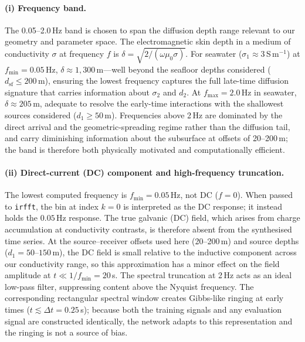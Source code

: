 \documentclass[journal]{IEEEtran}
\begin{document}
\paragraph{(i) Frequency band.}
The 0.05--2.0\,Hz band is chosen to span the diffusion depth range
relevant to our geometry and parameter space.  The electromagnetic
skin depth in a medium of conductivity $\sigma$ at frequency $f$ is
$\delta = \sqrt{2/(\omega\mu_0\sigma)}$.  For seawater
($\sigma_1 \approx 3$\,S\,m$^{-1}$) at $f_\mathrm{min} = 0.05$\,Hz,
$\delta \approx 1{,}300$\,m---well beyond the seafloor depths
considered ($d_\mathrm{sf} \leq 200$\,m), ensuring the lowest
frequency captures the full late-time diffusion signature
that carries information about $\sigma_2$ and $d_2$.  At
$f_\mathrm{max} = 2.0$\,Hz in seawater, $\delta \approx 205$\,m,
adequate to resolve the early-time interactions with the shallowest
sources considered ($d_1 \geq 50$\,m).  Frequencies above 2\,Hz
are dominated by the direct arrival and the geometric-spreading
regime rather than the diffusion tail, and carry diminishing
information about the subsurface at offsets of 20--200\,m; the
band is therefore both physically motivated and computationally
efficient.

\paragraph{(ii) Direct-current (DC) component and high-frequency truncation.}
The lowest computed frequency is $f_\mathrm{min} = 0.05$\,Hz,
not DC ($f = 0$).  When passed to \texttt{irfft}, the bin at index
$k = 0$ is interpreted as the DC response; it instead holds the
$0.05$\,Hz response.  The true galvanic (DC) field, which arises
from charge accumulation at conductivity contrasts, is therefore
absent from the synthesised time series.  At the source--receiver
offsets used here (20--200\,m) and source depths
($d_1 = 50$--$150$\,m), the DC field is small relative to the
inductive component across our conductivity range, so this
approximation has a minor effect on the field amplitude at
$t \ll 1/f_\mathrm{min} = 20$\,s.  The spectral truncation at
2\,Hz acts as an ideal low-pass filter, suppressing content
above the Nyquist frequency.  The corresponding rectangular
spectral window creates Gibbs-like ringing at early times
($t \lesssim \Delta t = 0.25$\,s); because both the training
signals and any evaluation signal are constructed identically, the
network adapts to this representation and the ringing is not
a source of bias.
\end{document}
